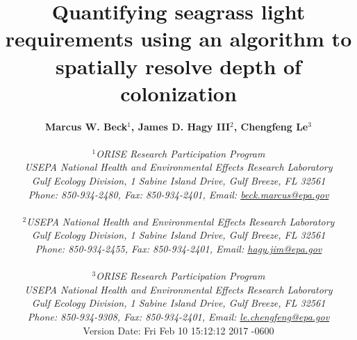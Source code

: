 \documentclass[letterpaper,12pt,oneside]{article}\usepackage[]{graphicx}\usepackage[]{color}
\begin{document}
\raggedbottom
\linenumbers
\raggedright
{}
\setlength{\parindent}{0.5in}
\renewcommand\refname{References \vspace{12pt}}

\begin{singlespace}
\title{{\bf {\Large Quantifying seagrass light requirements using an algorithm to spatially resolve depth of colonization}}}
\author{
  {\bf {\normalsize Marcus W. Beck$^1$, James D. Hagy III$^2$, Chengfeng Le$^3$}}
  \\\\{\textit {\normalsize $^1$ORISE Research Participation Program}}
  \\{\textit {\normalsize USEPA National Health and Environmental Effects Research Laboratory}}
  \\{\textit {\normalsize Gulf Ecology Division, 1 Sabine Island Drive, Gulf Breeze, FL 32561}}
	\\{\textit {\normalsize Phone: 850-934-2480, Fax: 850-934-2401, Email: \href{mailto:beck.marcus@epa.gov}{beck.marcus@epa.gov}}}
  \\\\{\textit {\normalsize $^2$USEPA National Health and Environmental Effects Research Laboratory}}
	\\{\textit {\normalsize Gulf Ecology Division, 1 Sabine Island Drive, Gulf Breeze, FL 32561}}
	\\{\textit {\normalsize Phone: 850-934-2455, Fax: 850-934-2401, Email: \href{mailto:hagy.jim@epa.gov}{hagy.jim@epa.gov}}}
  \\\\{\textit {\normalsize $^3$ORISE Research Participation Program}}
  \\{\textit {\normalsize USEPA National Health and Environmental Effects Research Laboratory}}
  \\{\textit {\normalsize Gulf Ecology Division, 1 Sabine Island Drive, Gulf Breeze, FL 32561}}
  \\{\textit {\normalsize Phone: 850-934-9308, Fax: 850-934-2401, Email: \href{mailto:le.chengfeng@epa.gov}{le.chengfeng@epa.gov}}}
  \vspace{1in} 
  \\ Version Date:   Fri Feb 10 15:12:12 2017 -0600
	}
\date{}
\maketitle
\end{singlespace}
\clearpage
\end{document}

